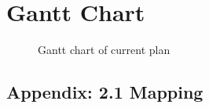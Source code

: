 \documentclass[progress]{cmpreport}
\begin{document}
\section{Gantt Chart}

\begin{figure}[h]
	\noindent{}
	\caption{Gantt chart of current plan}
\end{figure}




\newpage
\begin{appendix}
	\section{Appendix: 2.1 Mapping}


\end{appendix}
\end{document}
